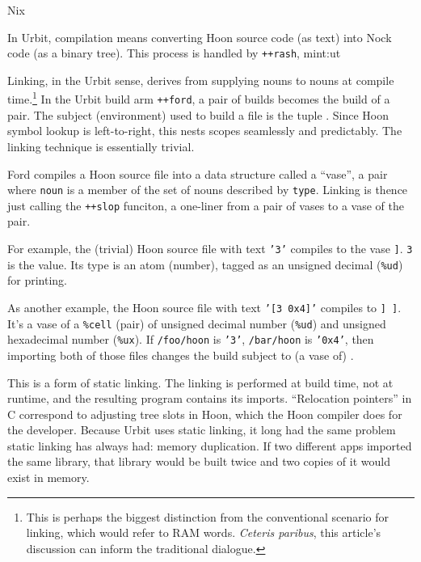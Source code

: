 \documentclass[twoside]{article}
\begin{document}
Nix

In Urbit, compilation means converting Hoon source code (as text) into Nock code (as a binary tree).  This process is handled by \texttt{++rash}, mint:ut

Linking, in the Urbit sense, derives from supplying nouns to nouns at compile time.\footnote{This is perhaps the biggest distinction from the conventional scenario for linking, which would refer to RAM words.  \emph{Ceteris paribus}, this article's discussion can inform the traditional dialogue.}  In the Urbit build arm \texttt{++ford}, a pair of builds becomes the build of a pair.  The subject (environment) used to build a file is the tuple \texttt{}.  Since Hoon symbol lookup is left-to-right, this nests scopes seamlessly and predictably.  The linking technique is essentially trivial.

Ford compiles a Hoon source file into a data structure called a “vase”, a pair \texttt{} where \texttt{noun} is a member of the set of nouns described by \texttt{type}.  Linking is thence just calling the \texttt{++slop} funciton, a one-liner from a pair of vases to a vase of the pair.

For example, the (trivial) Hoon source file with text \texttt{'3'} compiles to the vase \texttt{\string[\string[\%atom \%ud \textasciitilde\string] 3\string]}.  \texttt{3} is the value.  Its type is an atom (number), tagged as an unsigned decimal (\texttt{\%ud}) for printing.

As another example, the Hoon source file with text \texttt{'[3 0x4]'} compiles to \texttt{\string[\string[\%cell \string[\%atom \%ud \textasciitilde\string] \string] \string[3 0x4\string]\string]}.  It's a vase of a \texttt{\%cell} (pair) of unsigned decimal number (\texttt{\%ud}) and unsigned hexadecimal number (\texttt{\%ux}).  If \texttt{/foo/hoon} is \texttt{'3'}, \texttt{/bar/hoon} is \texttt{'0x4'}, then importing both of those files changes the build subject to (a vase of) \texttt{\string[foo=3 bar=0x4 <stdlib>\string]}.

This is a form of static linking.  The linking is performed at build time, not at runtime, and the resulting program contains its imports.  “Relocation pointers” in C correspond to adjusting tree slots in Hoon, which the Hoon compiler does for the developer.  Because Urbit uses static linking, it long had the same problem static linking has always had:  memory duplication.  If two different apps imported the same library, that library would be built twice and two copies of it would exist in memory.
\end{document}
